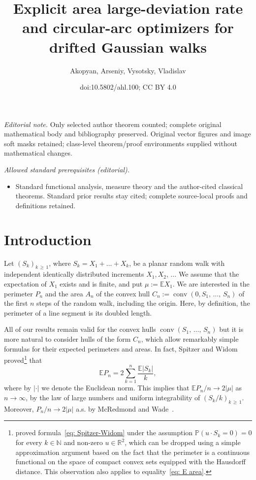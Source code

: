 \documentclass[10pt]{amsart}
\title{Explicit area large-deviation rate and circular-arc optimizers for drifted Gaussian walks}
\author{Akopyan, Arseniy, Vysotsky, Vladislav}
\date{doi:10.5802/ahl.100; CC BY 4.0}
\theoremstyle{definition}\newtheorem{defi}[theo]{Definition}\newtheorem{rema}[theo]{Remark}\newtheorem{exam}[theo]{Example}\newtheorem{exem}[theo]{Example}\newtheorem{nota}[theo]{Notation}
\DeclareMathOperator{\conv}{conv}
\newcommand{\Rbb}{\mathbb{R}}
\newcommand{\N}{\mathbb{N}}
\newcommand{\E}{\mathbb{E}}
\newcommand{\Pbb}{\mathbb{P}}
\begin{document}
\maketitle
\noindent\textit{Editorial note.} Only selected author theorem counted; complete original mathematical body and bibliography preserved. Original vector figures and image soft masks retained; class-level theorem/proof environments supplied without mathematical changes.\par\medskip
\noindent\textit{Allowed standard prerequisites (editorial).}\begin{itemize}
\item Standard functional analysis, measure theory and the author-cited classical theorems. Standard prior results stay cited; complete source-local proofs and definitions retained.
\end{itemize}\medskip

\section{Introduction} \label{Sec: intro}
Let $(S_k)_{k\,\ge\,1}$, where $S_k = X_1 + \ldots + X_k$, be a planar random walk with independent identically distributed increments $X_1, X_2,\,\ldots$ We assume that the expectation of $X_1$ exists and is finite, and put $\mu := \E X_1$. We are interested in the perimeter $P_n$ and the area $A_n$ of the convex hull $C_n:=\conv(0, S_1,\,\dots,\,S_n)$ of the first $n$ steps of the random walk, including the origin. Here, by definition, the perimeter of a line segment is its doubled length.

All of our results remain valid for the convex hulls $\conv(S_1,\,\dots,\,S_n)$ but it is more natural to consider hulls of the form $C_n$, which allow remarkably simple formulas for their expected perimeters and areas. In fact, Spitzer and Widom~\cite{SpitzerWidom} proved\footnote{\cite{SpitzerWidom} proved formula~\eqref{eq: Spitzer-Widom} under the assumption $\Pbb(u \cdot S_k=0)=0$ for every $k \in \N$ and non-zero $u \in \Rbb^2$, which can be dropped using a simple approximation argument based on the fact that the perimeter is a continuous functional on the space of compact convex sets equipped with the Hausdorff distance. This observation also applies to equality~\eqref{eq: E area}.} that
\begin{equation}\label{eq: Spitzer-Widom}
\E P_n = 2 \sum_{k=1}^n \frac{\E |S_k|}{k},
\end{equation}
where by $|\cdot|$ we denote the Euclidean norm. This implies that $\E P_n/n \to 2 |\mu|$ as $n \to \infty$, by the law of large numbers and uniform integrability of $(S_k/k)_{k\,\ge\,1}$. Moreover, $P_n/n \to 2|\mu|$ a.s. by McRedmond and Wade~\cite{McRedmondWade}.
\end{document}
